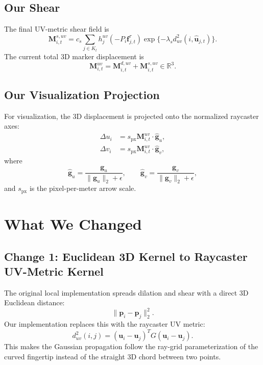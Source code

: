 \documentclass[11pt]{article}
\newcommand{\R}{\mathbb{R}}
\begin{document}
\subsection{Our Shear}

The final UV-metric shear field is
\begin{equation}
    \mathbf{M}^{s,uv}_{i,t}
    =
    c_s
    \sum_{j\in K_t}
    h^{uv}_j
    \left(
        -P_i\mathbf{f}^{\tau}_{j,t}
    \right)
    \exp\{
        -\lambda_s
        d^2_{uv}(i,\hat{\mathbf{u}}_{j,t})
    \}.
    \label{eq:our-shear}
\end{equation}
The current total 3D marker displacement is
\begin{equation}
    \mathbf{M}^{uv}_{i,t}
    =
    \mathbf{M}^{d,uv}_{i,t}
    +
    \mathbf{M}^{s,uv}_{i,t}
    \in\R^3.
    \label{eq:our-total}
\end{equation}

\subsection{Our Visualization Projection}

For visualization, the 3D displacement is projected onto the normalized
raycaster axes:
\begin{align}
    \Delta u_i
    &=
    s_{\mathrm{px}}
    \mathbf{M}^{uv}_{i,t}
    \cdot
    \hat{\mathbf{g}}_u, \\
    \Delta v_i
    &=
    s_{\mathrm{px}}
    \mathbf{M}^{uv}_{i,t}
    \cdot
    \hat{\mathbf{g}}_v,
    \label{eq:our-visualization}
\end{align}
where
\begin{equation}
    \hat{\mathbf{g}}_u
    =
    \frac{\mathbf{g}_u}{\|\mathbf{g}_u\|_2+\epsilon},
    \qquad
    \hat{\mathbf{g}}_v
    =
    \frac{\mathbf{g}_v}{\|\mathbf{g}_v\|_2+\epsilon},
\end{equation}
and $s_{\mathrm{px}}$ is the pixel-per-meter arrow scale.

\section{What We Changed}

\subsection{Change 1: Euclidean 3D Kernel to Raycaster UV-Metric Kernel}

The original local implementation spreads dilation and shear with a direct 3D
Euclidean distance:
\begin{equation}
    \|\mathbf{p}_i-\mathbf{p}_j\|_2^2.
\end{equation}
Our implementation replaces this with the raycaster UV metric:
\begin{equation}
    d^2_{uv}(i,j)
    =
    (\mathbf{u}_i-\mathbf{u}_j)^T
    G
    (\mathbf{u}_i-\mathbf{u}_j).
\end{equation}
This makes the Gaussian propagation follow the ray-grid parameterization of the
curved fingertip instead of the straight 3D chord between two points.
\end{document}
